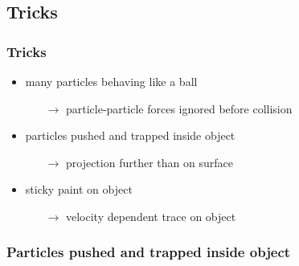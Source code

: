 \subsection{Tricks}
\begin{frame}
	\frametitle{Tricks}
	\begin{itemize}
		\item many particles behaving like a ball
			\begin{itemize}
				\item[$\to$] particle-particle forces ignored before collision
			\end{itemize}
		\item particles pushed and trapped inside object
			\begin{itemize}
				\item[$\to$] projection further than on surface
			\end{itemize}
		\item sticky paint on object
			\begin{itemize}
				\item[$\to$] velocity dependent trace on object
			\end{itemize}
	\end{itemize}
\end{frame}
\begin{frame}
	\frametitle{Particles pushed and trapped inside object}
	\begin{columns}
		\begin{column}{0.5\textwidth}
			\begin{figure}[]
				\label{fig:pm1}
			\end{figure}
		\end{column}
		\begin{column}{0.5\textwidth}
			\begin{figure}[]
			\end{figure}
		\end{column}
	\end{columns}
\end{frame}

